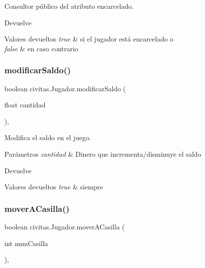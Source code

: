 Consultor público del atributo encarcelado. \begin{DoxyReturn}{Devuelve}

\end{DoxyReturn}

\begin{DoxyRetVals}{Valores devueltos}
{\em true} & si el jugador está encarcelado o \\
\hline
{\em false} & en caso contrario \\
\hline
\end{DoxyRetVals}
\mbox{\label{classcivitas_1_1Jugador_ae091c2f1256a809aab42c1478056a861}} 
\subsubsection{\texorpdfstring{modificar\+Saldo()}{modificarSaldo()}}
{\footnotesize\ttfamily boolean civitas.\+Jugador.\+modificar\+Saldo (\begin{DoxyParamCaption}\item[{float}]{cantidad }\end{DoxyParamCaption})\hspace{0.3cm}{\ttfamily [inline]}, {\ttfamily [package]}}

Modifica el saldo en el juego. 
\begin{DoxyParams}{Parámetros}
{\em cantidad} & Dinero que incrementa/disminuye el saldo \\
\hline
\end{DoxyParams}
\begin{DoxyReturn}{Devuelve}

\end{DoxyReturn}

\begin{DoxyRetVals}{Valores devueltos}
{\em true} & siempre \\
\hline
\end{DoxyRetVals}
\mbox{\label{classcivitas_1_1Jugador_af227e8b7b1b41f042f24e7f65062aa7c}} 
\subsubsection{\texorpdfstring{mover\+A\+Casilla()}{moverACasilla()}}
{\footnotesize\ttfamily boolean civitas.\+Jugador.\+mover\+A\+Casilla (\begin{DoxyParamCaption}\item[{int}]{num\+Casilla }\end{DoxyParamCaption})\hspace{0.3cm}{\ttfamily [inline]}, {\ttfamily [package]}}

